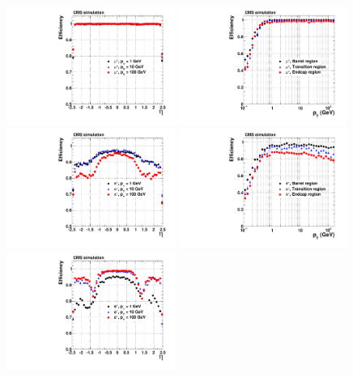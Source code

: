 \begin{figure}[htbp]
\centering
\includegraphics[width=0.49\textwidth]{figs/data-mc/chargedParticles/SingleParticles/mu/efficiencyVsEta.pdf}
\includegraphics[width=0.49\textwidth]{figs/data-mc/chargedParticles/SingleParticles/mu/efficiencyVsPt.pdf}
\\
\includegraphics[width=0.49\textwidth]{figs/data-mc/chargedParticles/SingleParticles/pi/efficiencyVsEta.pdf}
\includegraphics[width=0.49\textwidth]{figs/data-mc/chargedParticles/SingleParticles/pi/efficiencyVsPt.pdf}
\\
\includegraphics[width=0.49\textwidth]{figs/data-mc/chargedParticles/SingleParticles/el/efficiencyVsEta.pdf}

\end{figure}
